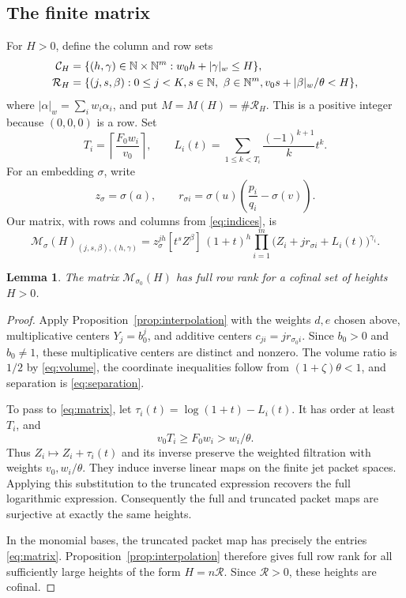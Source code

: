 \documentclass[11pt]{article}
\newtheorem{lemma}[theorem]{Lemma}
\theoremstyle{definition}
\theoremstyle{remark}
\theoremstyle{plain}
\newcommand{\N}{\mathbb N}
\newcommand{\wt}[1]{\lvert #1\rvert_w}
\begin{document}
\subsection{The finite matrix}
For \(H>0\), define the column and row sets
\begin{align}
 \mathcal C_H&=\{(h,\gamma)\in\N\times\N^m:
                   w_0h+\wt\gamma\le H\},\label{eq:indices}\\
 \mathcal R_H&=\{(j,s,\beta):0\le j<K, s\in\N,\ \beta\in\N^m,
                   v_0s+\wt\beta/\theta<H\},\notag
\end{align}
where \(\wt\alpha=\sum_iw_i\alpha_i\), and put \(M=M(H)=\#\mathcal R_H\).
This is a positive integer because \((0,0,0)\) is a row. Set
\begin{equation}\label{eq:truncations}
 T_i=\left\lceil\frac{F_0w_i}{v_0}\right\rceil,\qquad
 L_i(t)=\sum_{1\le k<T_i}\frac{(-1)^{k+1}}k t^k.
\end{equation}
For an embedding \(\sigma\), write
\begin{equation}\label{eq:centers}
 z_\sigma=\sigma(a),\qquad
 r_{\sigma i}=\sigma(u)\left(\frac{p_i}{q_i}-\sigma(v)\right).
\end{equation}
Our matrix, with rows and columns from \eqref{eq:indices}, is
\begin{equation}\label{eq:matrix}
 \mathcal M_\sigma(H)_{(j,s,\beta),(h,\gamma)}
 =z_\sigma^{jh}[t^sZ^\beta]\,
       (1+t)^h\prod_{i=1}^m
       \bigl(Z_i+jr_{\sigma i}+L_i(t)\bigr)^{\gamma_i}.
\end{equation}
\begin{lemma}\label{lem:cofinal}
The matrix \(\mathcal M_{\sigma_0}(H)\) has full row rank for a cofinal
set of heights \(H>0\).
\end{lemma}
\begin{proof}
Apply Proposition~\ref{prop:interpolation} with the weights \(d,e\)
chosen above, multiplicative centers \(Y_j=b_0^j\), and additive
centers \(c_{ji}=jr_{\sigma_0 i}\). Since \(b_0>0\) and
\(b_0\ne1\), these multiplicative centers are distinct and nonzero.
The volume ratio is \(1/2\) by \eqref{eq:volume}, the coordinate
inequalities follow from \((1+\zeta)\theta<1\), and separation is
\eqref{eq:separation}.

To pass to \eqref{eq:matrix}, let
\(\tau_i(t)=\log(1+t)-L_i(t)\). It has order at least \(T_i\), and
\[
 v_0T_i\ge F_0w_i> w_i/\theta.
\]
Thus \(Z_i\mapsto Z_i+\tau_i(t)\) and its inverse preserve the
weighted filtration with weights \(v_0,w_i/\theta\). They induce
inverse linear maps on the finite jet packet spaces. Applying this
substitution to the truncated expression recovers the full logarithmic
expression. Consequently the full and truncated packet maps are
surjective at exactly the same heights.

In the monomial bases, the truncated packet map has precisely the entries
\eqref{eq:matrix}. Proposition~\ref{prop:interpolation} therefore gives
full row rank for all sufficiently large heights of the form
\(H=n\mathcal R\). Since \(\mathcal R>0\), these heights are cofinal.
\end{proof}
\end{document}
